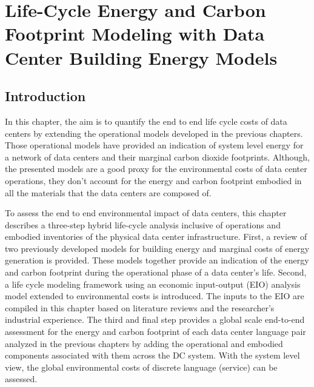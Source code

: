 \chapter{Life-Cycle Energy and Carbon Footprint Modeling with Data Center Building Energy Models}
\label{chp:embodied_cost_model}

\section{Introduction}
    In this chapter, the aim is to quantify the end to end life cycle costs of data centers by extending the operational models developed in the previous chapters. Those operational models have provided an indication of system level energy for a network of data centers and their marginal carbon dioxide footprints. Although, the presented models are a good proxy for the environmental costs of data center operations, they don't account for the energy and carbon footprint embodied in all the materials that the data centers are composed of.

    To assess the end to end environmental impact of data centers, this chapter describes a three-step hybrid life-cycle analysis inclusive of operations and embodied inventories of the physical data center infrastructure. First, a review of two previously developed models for building energy and marginal costs of energy generation is provided. These models together provide an indication of the energy and carbon footprint during the operational phase of a data center's life. Second, a life cycle modeling framework using an economic input-output (EIO) analysis model extended to environmental costs is introduced. The inputs to the EIO are compiled in this chapter based on literature reviews and the researcher's industrial experience. The third and final step provides a global scale end-to-end assessment for the energy and carbon footprint of each data center language pair analyzed in the previous chapters by adding the operational and embodied components associated with them across the DC system. With the system level view, the global environmental costs of discrete language (service) can be assessed.

